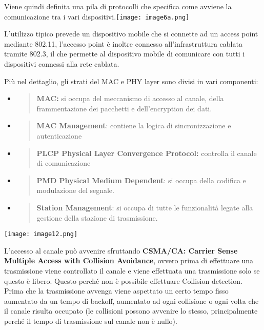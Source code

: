 Viene quindi definita una pila di protocolli che specifica come avviene
la comunicazione tra i vari
dispositivi.\texttt{[image: image6a.png]}

L'utilizzo tipico prevede un dispositivo mobile che si connette ad un
access point mediante 802.11, l'accesso point è inoltre connesso
all'infrastruttura cablata tramite 802.3, il che permette al dispositivo
mobile di comunicare con tutti i dispositivi connessi alla rete cablata.

Più nel dettaglio, gli strati del MAC e PHY layer sono divisi in vari
componenti:

\begin{itemize}
\item
  \begin{quote}
  \textbf{MAC:} si occupa del meccanismo di accesso al canale, della
  frammentazione dei pacchetti e dell'encryption dei dati.
  \end{quote}
\item
  \begin{quote}
  \textbf{MAC Management}: contiene la logica di sincronizzazione e
  autenticazione
  \end{quote}
\item
  \begin{quote}
  \textbf{PLCP Physical Layer Convergence Protocol:} controlla il canale
  di comunicazione
  \end{quote}
\item
  \begin{quote}
  \textbf{PMD Physical Medium Dependent}: si occupa della codifica e
  modulazione del segnale.
  \end{quote}
\item
  \begin{quote}
  \textbf{Station Management}: si occupa di tutte le funzionalità legate
  alla gestione della stazione di trasmissione.
  \end{quote}
\end{itemize}

\texttt{[image: image12.png]}

L'accesso al canale può avvenire sfruttando \textbf{CSMA/CA: Carrier Sense
Multiple Access with Collision Avoidance}, ovvero prima di effettuare
una trasmissione viene controllato il canale e viene effettuata una
trasmissione solo se questo è libero. Questo perché non è possibile
effettuare Collision detection. Prima che la trasmissione avvenga viene aspettato
un certo tempo fisso aumentato da un tempo di backoff, aumentato ad ogni 
collisione o ogni volta che il canale risulta occupato (le collisioni possono 
avvenire lo stesso, principalmente perché il tempo di trasmissione sul canale 
non è nullo).

